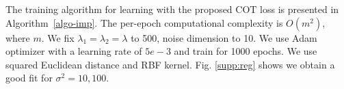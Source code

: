 The training algorithm for learning with the proposed COT loss is presented in Algorithm~\ref{algo-imp}. The per-epoch computational complexity is $O(m^2)$, where $m$. We fix $\lambda_1=\lambda_2=\lambda$ to 500, noise dimension to 10. We use Adam optimizer with a learning rate of $5e-3$ and train for 1000 epochs. We use squared Euclidean distance and RBF kernel. Fig. \ref{supp:reg} shows we obtain a good fit for $\sigma^2=10, 100$.
 
